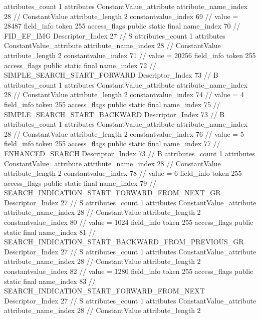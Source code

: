 {{{{{				attributes_count	1
				attributes {
				ConstantValue_attribute {
					attribute_name_index	28		// ConstantValue
					attribute_length	2
					constantvalue_index	69		// value = 28487
				}
				}
			}
			field_info {
				token	255
				access_flags	public static final
				name_index	70		// FID_EF_IMG
				Descriptor_Index	27		// S
				attributes_count	1
				attributes {
				ConstantValue_attribute {
					attribute_name_index	28		// ConstantValue
					attribute_length	2
					constantvalue_index	71		// value = 20256
				}
				}
			}
			field_info {
				token	255
				access_flags	public static final
				name_index	72		// SIMPLE_SEARCH_START_FORWARD
				Descriptor_Index	73		// B
				attributes_count	1
				attributes {
				ConstantValue_attribute {
					attribute_name_index	28		// ConstantValue
					attribute_length	2
					constantvalue_index	74		// value = 4
				}
				}
			}
			field_info {
				token	255
				access_flags	public static final
				name_index	75		// SIMPLE_SEARCH_START_BACKWARD
				Descriptor_Index	73		// B
				attributes_count	1
				attributes {
				ConstantValue_attribute {
					attribute_name_index	28		// ConstantValue
					attribute_length	2
					constantvalue_index	76		// value = 5
				}
				}
			}
			field_info {
				token	255
				access_flags	public static final
				name_index	77		// ENHANCED_SEARCH
				Descriptor_Index	73		// B
				attributes_count	1
				attributes {
				ConstantValue_attribute {
					attribute_name_index	28		// ConstantValue
					attribute_length	2
					constantvalue_index	78		// value = 6
				}
				}
			}
			field_info {
				token	255
				access_flags	public static final
				name_index	79		// SEARCH_INDICATION_START_FORWARD_FROM_NEXT_GR
				Descriptor_Index	27		// S
				attributes_count	1
				attributes {
				ConstantValue_attribute {
					attribute_name_index	28		// ConstantValue
					attribute_length	2
					constantvalue_index	80		// value = 1024
				}
				}
			}
			field_info {
				token	255
				access_flags	public static final
				name_index	81		// SEARCH_INDICATION_START_BACKWARD_FROM_PREVIOUS_GR
				Descriptor_Index	27		// S
				attributes_count	1
				attributes {
				ConstantValue_attribute {
					attribute_name_index	28		// ConstantValue
					attribute_length	2
					constantvalue_index	82		// value = 1280
				}
				}
			}
			field_info {
				token	255
				access_flags	public static final
				name_index	83		// SEARCH_INDICATION_START_FORWARD_FROM_NEXT
				Descriptor_Index	27		// S
				attributes_count	1
				attributes {
				ConstantValue_attribute {
					attribute_name_index	28		// ConstantValue
					attribute_length	2
}}}}}}}
